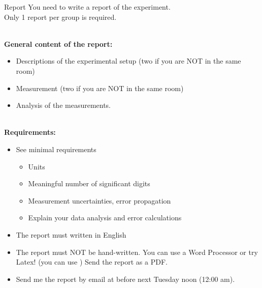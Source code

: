 \documentclass[9pt, xcolor=dvipsnames]{beamer}
\newcommand{\hreff}[3][blue]{\href{#2}{\color{#1}{#3}}}%
\begin{document}
\begin{frame}{Report }
You need to write a report of the experiment. \\
Only 1 report per group is required.

~\\

\textbf{General content of the report:}
\begin{itemize}
    \item Descriptions of the experimental setup (two if you are NOT in the same room)
    \item Measurement  (two if you are NOT in the same room)
    \item Analysis of the measurements.
\end{itemize}

~\\
\textbf{Requirements:}
\begin{itemize}
    \item See minimal requirements \hreff{https://p.phys.ethz.ch/WeitereDoks/MinimalRequirementsReport.pdf}{here}\\
    \begin{itemize}
        \item Units
        \item Meaningful number of significant digits
        \item Measurement uncertainties, error propagation
        \item Explain your data analysis and error calculations
    \end{itemize}
    \item The report must written in English
    \item The report must NOT be hand-written. You can use a Word Processor or try Latex! (you can use \hreff{https://www.overleaf.com/}{Overleaf}) Send the report as a PDF.
    \item Send me the report by email at \hreff{mailto:masgalli@phys.ethz.ch}{masgalli@phys.ethz.ch} before next Tuesday noon (12:00 am).
\end{itemize}
\end{frame}
\end{document}
